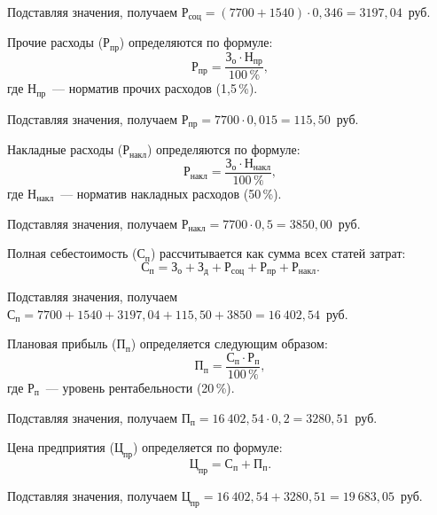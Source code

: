 Подставляя значения, получаем $\text{Р}_{\text{соц}} = (7700 + 1540) \cdot 0,346 = 3197,04$~руб.

Прочие расходы ($\text{Р}_{\text{пр}}$) определяются по формуле:
\begin{equation}
    \text{Р}_{\text{пр}} = \frac{\text{З}_{\text{о}} \cdot \text{Н}_{\text{пр}}}{100\,\%},
\end{equation}
\noindent где $\text{Н}_{\text{пр}}$~--- норматив прочих расходов (1,5\,\%).

Подставляя значения, получаем $\text{Р}_{\text{пр}} = 7700 \cdot 0,015 = 115,50$~руб.

Накладные расходы ($\text{Р}_{\text{накл}}$) определяются по формуле:
\begin{equation}
    \text{Р}_{\text{накл}} = \frac{\text{З}_{\text{о}} \cdot \text{Н}_{\text{накл}}}{100\,\%},
\end{equation}
\noindent где $\text{Н}_{\text{накл}}$~--- норматив накладных расходов (50\,\%).

Подставляя значения, получаем $\text{Р}_{\text{накл}} = 7700 \cdot 0,5 = 3850,00$~руб.

Полная себестоимость ($\text{С}_{\text{п}}$) рассчитывается как сумма всех статей затрат:
\begin{equation}
    \text{С}_{\text{п}} = \text{З}_{\text{о}} + \text{З}_{\text{д}} + \text{Р}_{\text{соц}} + \text{Р}_{\text{пр}} + \text{Р}_{\text{накл}}.
\end{equation}

Подставляя значения, получаем $\text{С}_{\text{п}} = 7700 + 1540 + 3197,04 + 115,50 + 3850 = 16~402,54$~руб.

Плановая прибыль ($\text{П}_{\text{п}}$) определяется следующим образом:
\begin{equation}
    \text{П}_{\text{п}} = \frac{\text{С}_{\text{п}} \cdot \text{Р}_{\text{п}}}{100\,\%},
\end{equation}
\noindent где $\text{Р}_{\text{п}}$~--- уровень рентабельности (20\,\%).

Подставляя значения, получаем $\text{П}_{\text{п}} = 16~402,54 \cdot 0,2 = 3280,51$~руб.

Цена предприятия ($\text{Ц}_{\text{пр}}$) определяется по формуле:
\begin{equation}
    \text{Ц}_{\text{пр}} = \text{С}_{\text{п}} + \text{П}_{\text{п}}.
\end{equation}

Подставляя значения, получаем $\text{Ц}_{\text{пр}} = 16~402,54 + 3280,51 = 19~683,05$~руб.

